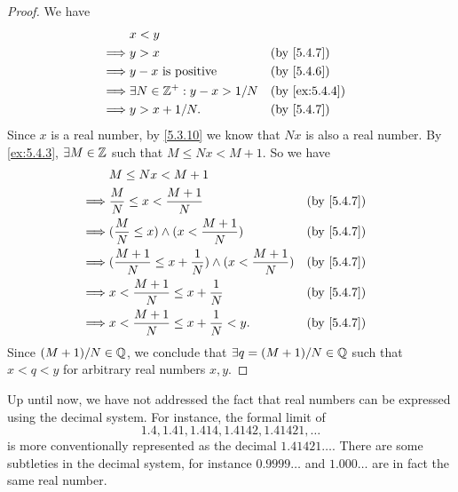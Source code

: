 \begin{proof}
	We have
	\begin{align*}
		         & x < y                                                 \\
		\implies & y > x                              &  & \by{5.4.7}    \\
		\implies & y - x \text{ is positive}          &  & \by{5.4.6}    \\
		\implies & \exists N \in \Z^+ : y - x > 1 / N &  & \by{ex:5.4.4} \\
		\implies & y > x + 1 / N.                     &  & \by{5.4.7}    \\
	\end{align*}
	Since \(x\) is a real number, by \cref{5.3.10} we know that \(Nx\) is also a real number.
	By \cref{ex:5.4.3}, \(\exists M \in \mathbb{Z}\) such that \(M \leq Nx < M + 1\).
	So we have
	\begin{align*}
		         & M \leq Nx < M + 1                                                                     \\
		\implies & \dfrac{M}{N} \leq x < \dfrac{M + 1}{N}                                &  & \by{5.4.7} \\
		\implies & (\dfrac{M}{N} \leq x) \land (x < \dfrac{M + 1}{N})                    &  & \by{5.4.7} \\
		\implies & (\dfrac{M + 1}{N} \leq x + \dfrac{1}{N}) \land (x < \dfrac{M + 1}{N}) &  & \by{5.4.7} \\
		\implies & x < \dfrac{M + 1}{N} \leq x + \dfrac{1}{N}                            &  & \by{5.4.7} \\
		\implies & x < \dfrac{M + 1}{N} \leq x + \dfrac{1}{N} < y.                       &  & \by{5.4.7}
	\end{align*}
	Since \((M + 1) / N \in \mathbb{Q}\), we conclude that \(\exists q = (M + 1) / N \in \mathbb{Q}\) such that \(x < q < y\) for arbitrary real numbers \(x, y\).
\end{proof}

\begin{rmk}\label{5.4.15}
	Up until now, we have not addressed the fact that real numbers can be expressed using the decimal system.
	For instance, the formal limit of
	\[
		1.4, 1.41, 1.414, 1.4142, 1.41421, \dots
	\]
	is more conventionally represented as the decimal \(1.41421\dots\).
	There are some subtleties in the decimal system, for instance \(0.9999\dots\) and \(1.000\dots\) are in fact the same real number.
\end{rmk}

